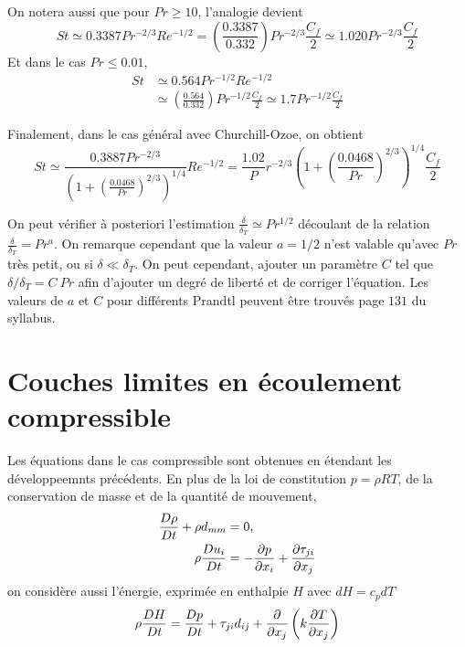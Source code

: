       On notera aussi que pour $Pr\geq 10$, l'analogie devient
      \begin{equation}
        St \simeq 0.3387 Pr^{-2/3} Re^{-1/2} = \left(\frac{0.3387}{0.332}\right) Pr^{-2/3} \frac{C_f}{2} \simeq 1.020 Pr^{-2/3} \frac{C_f}{2}
      \end{equation}
      Et dans le cas $Pr \leq 0.01$,
      \begin{equation}
        \begin{aligned}
          St &\simeq 0.564 Pr^{-1/2} Re^{-1/2}\\
          &\simeq \left(\frac{0.564}{0.332}\right) Pr^{-1/2} \frac{C_f}{2} \simeq 1.7 Pr^{-1/2} \frac{C_f}{2}
        \end{aligned}
      \end{equation}

      Finalement, dans le cas général avec Churchill-Ozoe, on obtient
      \begin{equation}
        St \simeq \frac{0.3887 Pr^{-2/3}}{\left(1 + \left(\frac{0.0468}{Pr}\right)^{2/3}\right)^{1/4}} Re^{-1/2} = \frac{1.02}Pr^{-2/3}{\left(1+\left(\frac{0.0468}{Pr}\right)^{2/3}\right)^{1/4}} \frac{C_f}{2}
      \end{equation}

      On peut vérifier à posteriori l'estimation $\frac{\delta}{\delta_T} \simeq Pr^{1/2}$ découlant de la relation $\frac{\delta}{\delta_T} = Pr^a$. On remarque cependant que la valeur $a = 1/2$ n'est valable qu'avec $Pr$ très petit, ou si $\delta \ll \delta_T$. On peut cependant, ajouter un paramètre $C$ tel que $\delta/\delta_T = C~Pr$ afin d'ajouter un degré de liberté et de corriger l'équation. Les valeurs de $a$ et $C$ pour différents Prandtl peuvent être trouvés page $131$ du syllabus.

  \section{Couches limites en écoulement compressible}
    Les équations dans le cas compressible sont obtenues en étendant les développeemnts précédents. En plus de la loi de constitution $p = \rho R T$, de la conservation de masse et de la quantité de mouvement,
    \begin{equation}
      \begin{aligned}
        \frac{D \rho}{D t} + \rho d_{mm} &= 0,\\
        \rho \frac{D u_i}{D t} &= - \pdv{p}{x_i} + \pdv{\tau_{ji}}{x_j}
      \end{aligned}
    \end{equation}
    on considère aussi l'énergie, exprimée en enthalpie $H$ avec $dH = c_p dT$
    \begin{equation}
      \rho \frac{D H}{D t} = \frac{D p}{D t} + \tau_{ji} d_{ij} + \pdv{x_j} \left(k \pdv{T}{x_j}\right)
    \end{equation}

